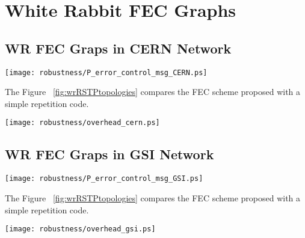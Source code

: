 \section{White Rabbit FEC Graphs}
\label{app:wr_fec_graphs}


\subsection{WR FEC Graps in  CERN Network}

\begin{center}
        \texttt{[image: robustness/P\_error\_control\_msg\_CERN.ps]}
         \label{fig:wrRSTPtopologies}
\end{center}

The Figure ~\ref{fig:wrRSTPtopologies} compares the FEC scheme proposed with a simple repetition code.


\begin{center}
        \texttt{[image: robustness/overhead\_cern.ps]}
         \label{fig:wrRSTPtopologies}
\end{center}



\subsection{WR FEC Graps in  GSI Network}


\begin{center}
        \texttt{[image: robustness/P\_error\_control\_msg\_GSI.ps]}
         \label{fig:wrRSTPtopologies}
\end{center}


The Figure ~\ref{fig:wrRSTPtopologies} compares the FEC scheme proposed with a simple repetition code.

\begin{center}
        \texttt{[image: robustness/overhead\_gsi.ps]}
         \label{fig:wrRSTPtopologies}
\end{center}

\label{app:wr_fec_Graphs}









